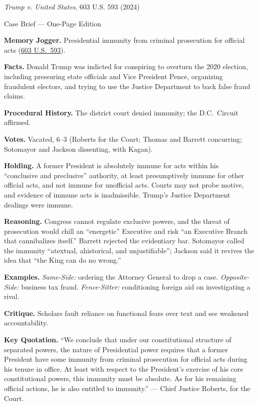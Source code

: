 \documentclass[12pt]{article}
\begin{document}
\begin{center}
{\Large \textit{Trump v. United States}, 603 U.S. 593 (2024)\par}
\vspace{0.3em}
{\normalsize Case Brief --- One-Page Edition\par}
\end{center}

\textbf{Memory Jogger.} Presidential immunity from criminal prosecution for official acts (\href{https://www.law.cornell.edu/supremecourt/text/23-939}{603 U.S.\ 593}).

\textbf{Facts.} Donald Trump was indicted for conspiring to overturn the 2020 election, including pressuring state officials and Vice President Pence, organizing fraudulent electors, and trying to use the Justice Department to back false fraud claims.

\textbf{Procedural History.} The district court denied immunity; the D.C.\ Circuit affirmed.

\textbf{Votes.} Vacated, 6--3 (Roberts for the Court; Thomas and Barrett concurring; Sotomayor and Jackson dissenting, with Kagan).

\textbf{Holding.} A former President is absolutely immune for acts within his ``conclusive and preclusive'' authority, at least presumptively immune for other official acts, and not immune for unofficial acts. Courts may not probe motive, and evidence of immune acts is inadmissible. Trump's Justice Department dealings were immune.

\textbf{Reasoning.} Congress cannot regulate exclusive powers, and the threat of prosecution would chill an ``energetic'' Executive and risk ``an Executive Branch that cannibalizes itself.'' Barrett rejected the evidentiary bar. Sotomayor called the immunity ``atextual, ahistorical, and unjustifiable''; Jackson said it revives the idea that ``the King can do no wrong.''

\textbf{Examples.} \emph{Same-Side:} ordering the Attorney General to drop a case. \emph{Opposite-Side:} business tax fraud. \emph{Fence-Sitter:} conditioning foreign aid on investigating a rival.

\textbf{Critique.} Scholars fault reliance on functional fears over text and see weakened accountability.

\textbf{Key Quotation.} ``We conclude that under our constitutional structure of separated powers, the nature of Presidential power requires that a former President have some immunity from criminal prosecution for official acts during his tenure in office. At least with respect to the President's exercise of his core constitutional powers, this immunity must be absolute. As for his remaining official actions, he is also entitled to immunity.'' --- Chief Justice Roberts, for the Court.
\end{document}
